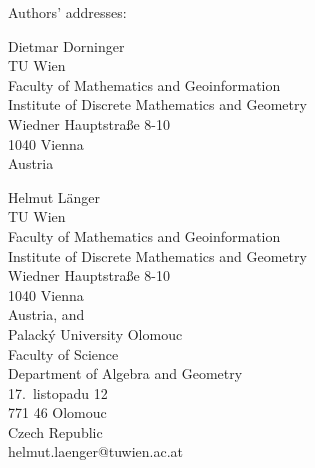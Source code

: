 \documentclass[12pt]{article}
\begin{document}
Authors' addresses:

Dietmar Dorninger \\
TU Wien \\
Faculty of Mathematics and Geoinformation \\
Institute of Discrete Mathematics and Geometry \\
Wiedner Hauptstra\ss e 8-10 \\
1040 Vienna \\
Austria

Helmut L\"anger \\
TU Wien \\
Faculty of Mathematics and Geoinformation \\
Institute of Discrete Mathematics and Geometry \\
Wiedner Hauptstra\ss e 8-10 \\
1040 Vienna \\
Austria, and \\
Palack\'y University Olomouc \\
Faculty of Science \\
Department of Algebra and Geometry \\
17.\ listopadu 12 \\
771 46 Olomouc \\
Czech Republic \\
helmut.laenger@tuwien.ac.at
\end{document}
